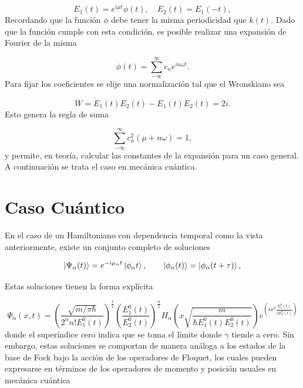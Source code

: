 \documentclass[10pt,a4paper]{report}
\begin{document}
\begin{equation}
E_1(t) = e^{i\mu t}\phi(t), \quad E_2(t)=E_1(-t),
\end{equation} Recordando que la función $\phi$ debe tener la misma periodicidad que $k(t)$. Dado que la función cumple con esta condición, es posible realizar una expansión de Fourier \cite{ArfkenMM} de la misma

\begin{equation}
\phi(t) = \sum_{-\infty}^\infty c_n e^{in\omega t}.
\end{equation} Para fijar los coeficientes se elije una normalización tal que el Wronskiano sea

\begin{equation}
W = \dot{E}_1(t)E_2(t)-E_1(t)\dot{E}_2(t) = 2i.
\end{equation}Esto genera la regla de suma

\begin{equation}
\sum_{-\infty}^\infty c_n^2(\mu + n\omega) = 1,
\end{equation} y permite, en teoría, calcular las constantes de la expansión para un caso general. A continuación se trata el caso en mecánica cuántica.

\section{Caso Cuántico}

En el caso de un Hamiltoniano con dependencia temporal como la vista anteriormente, existe un conjunto completo de soluciones \cite{BarnettSD}

\begin{equation}
\Ket{\Psi_\alpha (t)} = e^{-i\mu_\alpha t}\Ket{\phi_\alpha t}, \qquad \Ket{\phi_\alpha (t)}=\Ket{\phi_\alpha (t+\tau)},
\end{equation}

Estas soluciones tienen la forma explícita\cite{BrownPT}

\begin{equation}
\Psi_\alpha (x,t) = (\frac{\sqrt{m/\pi\hbar}}{2^\alpha n!E_1^0(t)})^{\frac{1}{2}}(\frac{E_1^0(t)}{E_2^0(t)})^\frac{\alpha}{2}H_\alpha(x\sqrt{\frac{m}{\hbar E_1^0(t) E_2^0(t)}})e^{(ix^2\frac{E_1^0(t)}{2E_2^0(t)})}
\end{equation} donde el superíndice cero indica que se toma el límite donde $\gamma$ tiende a cero. Sin embargo, estas soluciones se comportan de manera análoga a los estados de la base de Fock bajo la acción de los operadores de Floquet, los cuales pueden expresarse en términos de los operadores de momento y posición usuales en mecánica cuántica
\end{document}
